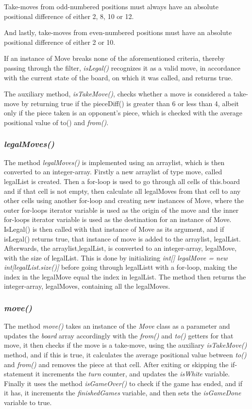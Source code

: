 \documentclass[12pt, a4paper]{article}
\begin{document}
Take-moves from odd-numbered positions must always have an absolute positional difference of either 2, 8, 10 or 12. \par
And lastly, take-moves from even-numbered positions must have an absolute positional difference of either 2 or 10. \par
If an instance of Move breaks none of the aforementioned criteria, thereby passing through the filter, \emph{isLegal()} recognizes it as a valid move, in accordance with the current state of the board, on which it was called, and returns true. \par
The auxiliary method, \emph{isTakeMove()}, checks whether a move is considered a take-move by returning true if the pieceDiff() is greater than 6 or less than 4, albeit only if the piece taken is an opponent's piece, which is checked with the average positional value of to() and \emph{from()}.

\subsubsection{\emph{legalMoves()}}
The method \emph{legalMoves()} is implemented using an arraylist, which is then converted to an integer-array. Firstly a new arraylist of type move, called legalList is created. Then a for-loop is used to go through all cells of this.board and if that cell is not empty, then calculate all legalMoves from that cell to any other cells using another for-loop and creating new instances of Move, where the outer for-loops iterator variable is used as the origin of the move and the inner for-loops iterator variable is used as the destination for an instance of Move. IsLegal() is then called with that instance of Move as its argument, and if isLegal() returns true, that instance of move is added to the arraylist, legalList. Afterwards, the arraylist,legalList, is converted to an integer-array, legalMove, with the size of legalList. This is done by initializing \emph{int[] legalMove = new int[legalList.size()]} before going through legalListt with a for-loop, making the index in the legalMove equal the index in legalList. The method then returns the integer-array, legalMoves, containing all the legalMoves.

\subsubsection{\emph{move()}}
The method \emph{move()} takes an instance of the \emph{Move} class as a parameter and updates the \emph{board} array accordingly with the \emph{from()} and \emph{to()} getters for that move, it then checks if the move is a take-move, using the auxiliary \emph{isTakeMove()} method, and if this is true, it calculates the average positional value between \emph{to()} and \emph{from()} and removes the piece at that cell.
After exiting or skipping the if-statement it increments the \emph{turn} counter, and updates the \emph{isWhite} variable. Finally it uses the method \emph{isGameOver()} to check if the game has ended, and if it has, it increments the \emph{finishedGames} variable, and then sets the \emph{isGameDone} variable to true.
\end{document}
